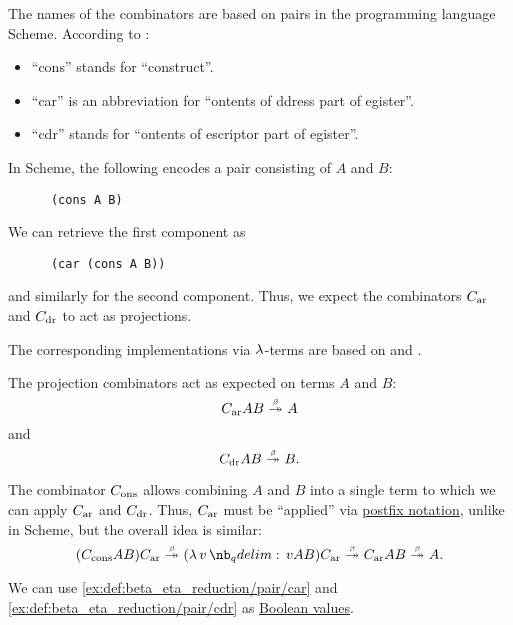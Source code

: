\begin{example}
\begin{thmenum}
    The names of the combinators are based on pairs in the programming language Scheme. According to :
    \begin{itemize}
      \item \enquote{cons} stands for \enquote{construct}.
      \item \enquote{car} is an abbreviation for \enquote{ontents of ddress part of egister}.
      \item \enquote{cdr} stands for \enquote{ontents of escriptor part of egister}.
    \end{itemize}

    In Scheme, the following encodes a pair consisting of \( A \) and \( B \):
    \begin{verbatim}
      (cons A B)
    \end{verbatim}

    We can retrieve the first component as
    \begin{verbatim}
      (car (cons A B))
    \end{verbatim}
    and similarly for the second component. Thus, we expect the combinators \( C_{\T{ar}} \) and \( C_{\T{dr}} \) to act as projections.

    The corresponding implementations via \( \mathrm{\lambda} \)-terms are based on \cite[exerc. 2.5]{AbelsonSussman2012eSICP} and \cite[def. 6.2.4]{Barendregt1984LambdaCalculus}.

    The projection combinators act as expected on terms \( A \) and \( B \):
    \begin{equation*}
      C_{\T{ar}} A B \bred* A
    \end{equation*}
    and
    \begin{equation*}
      C_{\T{dr}} A B \bred* B.
    \end{equation*}

    The combinator \( C_{\T{ons}} \) allows combining \( A \) and \( B \) into a single term to which we can apply \( C_{\T{ar}} \) and \( C_{\T{dr}} \). Thus, \( C_{\T{ar}} \) must be \enquote{applied} via \hyperref[rem:postfix_notation]{postfix notation}, unlike in Scheme, but the overall idea is similar:
    \begin{equation*}
      (C_{\T{cons}} A B) C_{\T{ar}}
      \bred*
      (\qabs v v A B) C_{\T{ar}}
      \bred*
      C_{\T{ar}} A B
      \bred*
      A.
    \end{equation*}

     We can use \ref{ex:def:beta_eta_reduction/pair/car} and \ref{ex:def:beta_eta_reduction/pair/cdr} as \hyperref[con:boolean_value]{Boolean values}.


\end{thmenum}
\end{example}
